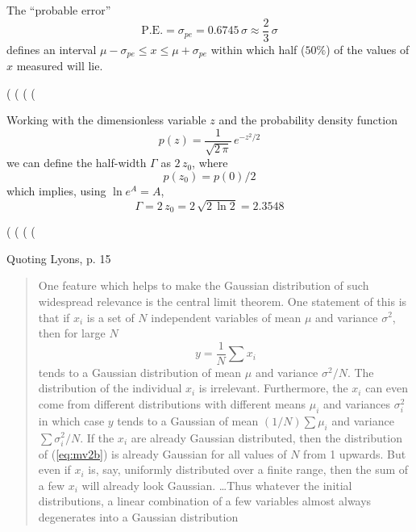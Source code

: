 \documentclass[12pt]{article}
\begin{document}
\noindent The ``probable error''
\begin{equation}
\text{P.E.} = \sigma_{pe} = 0.6745\,\sigma  \approx  \frac{2}{3}\,\sigma
\end{equation}
  defines an interval $\mu - \sigma_{pe} \le x \le \mu + \sigma_{pe}$ within which half ($50\%$) of the
   values of $x$ measured will lie.
\begin{myVerbatim}
(%
(%
(%
(%
\end{myVerbatim}
 Working with the dimensionless variable $z$ and the probability density function
\begin{equation}
  p(z) = \frac{1}{\sqrt{2\,\pi}}\, e^{-z^2/2}
\end{equation}
 we can define the half-width $\Gamma$ as $2\,z_0$, where
 \begin{equation}  
   p(z_0) = p(0)/2
 \end{equation}   
  which implies, using $\ln e^{A} = A$,
\begin{equation}
  \Gamma = 2\,z_0 = 2\,\sqrt{2\,\ln 2} = 2.3548
\end{equation}  
\begin{myVerbatim}
(%
(%
(%
(%
\end{myVerbatim}
\noindent Quoting Lyons, p. 15
\begin{quote}
One feature which helps to make the Gaussian distribution of such widespread relevance is
  the central limit theorem.
One statement of this is that  if $x_i$ is a set of $N$ independent variables of mean
   $\mu$ and variance $\sigma^2$, then for large $N$
\begin{equation}    \label{eq:mv2b}
 y = \frac{1}{N} \sum x_i
\end{equation}   
  tends to a Gaussian distribution of mean $\mu$ and variance $\sigma^2/N$.
The distribution of the individual $x_i$ is irrelevant.
Furthermore, the $x_i$ can even come from different distributions with different means $\mu_i$
   and variances $\sigma_i^2$ in which case $y$ tends to a Gaussian of mean
   $(1/N) \sum \mu_i$ and variance $\sum \sigma_i^2 / N$.
If the $x_i$ are already Gaussian distributed, then the distribution of   (\ref{eq:mv2b}) is
  already Gaussian for all values of $N$ from 1 upwards.
But even if $x_i$ is, say, uniformly distributed over a finite range, then the sum of
  a few $x_i$  will already look Gaussian.
\ldots Thus whatever the initial distributions, a linear combination of a few variables
  almost always degenerates into a Gaussian distribution  
\end{quote}  
\end{document}
